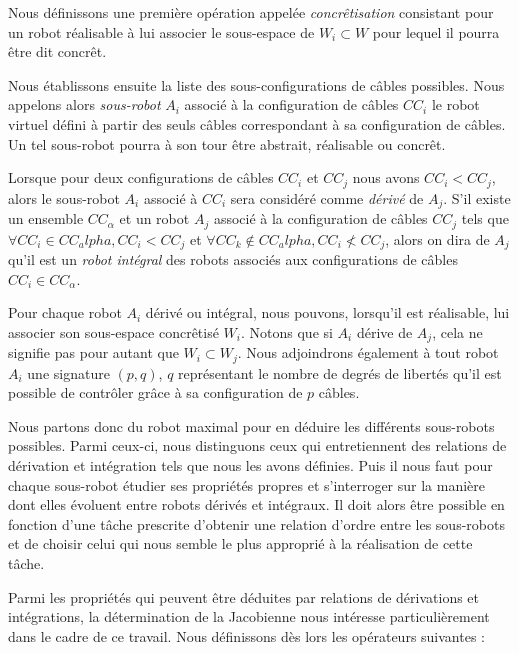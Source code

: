 Nous d\'efinissons une première op\'eration appel\'ee {\it concr\^etisation} 
consistant pour un robot r\'ealisable \`a lui associer le sous-espace de $W_i 
\subset W$ pour lequel il pourra \^etre dit concr\^et. 

Nous \'etablissons ensuite la liste des sous-configurations de c\^ables 
possibles. Nous appelons alors {\it sous-robot} $A_i$ associ\'e \`a la 
configuration de c\^ables $CC_i$ le robot virtuel d\'efini \`a partir des seuls 
c\^ables correspondant \`a sa configuration de c\^ables. Un tel sous-robot 
pourra \`a son tour \^etre abstrait, r\'ealisable ou concr\^et.

Lorsque pour deux configurations de c\^ables $CC_i$ et $CC_j$ nous avons $CC_i< 
CC_j$, alors le sous-robot $A_i$ associ\'e \`a $CC_i$ sera consid\'er\'e comme 
{\it d\'eriv\'e} de $A_j$. S'il existe un ensemble $CC_\alpha$ et un robot 
$A_j$ associ\'e \`a la configuration de c\^ables $CC_j$ tels que $\forall CC_i 
\in CC_alpha, CC_i < CC_j$ et $\forall CC_k \notin CC_alpha, CC_i \nless 
CC_j$, alors on dira de $A_j$ qu'il est un {\it robot int\'egral} des robots 
associ\'es aux configurations de c\^ables $CC_i \in CC_\alpha$.

Pour chaque robot $A_i$ d\'eriv\'e ou int\'egral, nous pouvons, lorsqu'il est 
r\'ealisable, lui associer son sous-espace concr\^etis\'e $W_i$. Notons que 
si $A_i$ d\'erive de $A_j$, cela ne signifie pas pour autant que $W_i 
\subset W_j$. Nous adjoindrons \'egalement \`a tout robot $A_i$ une signature 
$(p,q)$, $q$ repr\'esentant le nombre de degr\'es de libert\'es qu'il est 
possible de contr\^oler gr\^ace \`a sa configuration de $p$ c\^ables.

Nous partons donc du robot maximal pour en d\'eduire les diff\'erents 
sous-robots possibles. Parmi ceux-ci, nous distinguons ceux qui entretiennent 
des relations de d\'erivation et int\'egration tels que nous les avons 
d\'efinies. Puis il nous faut pour chaque sous-robot \'etudier ses 
propri\'et\'es propres et s'interroger sur la mani\`ere dont elles \'evoluent 
entre robots d\'eriv\'es et int\'egraux. Il doit alors \^etre possible en 
fonction d'une t\^ache prescrite d'obtenir une relation d'ordre entre les 
sous-robots et de choisir celui qui nous semble le plus appropri\'e \`a la 
r\'ealisation de cette t\^ache.

Parmi les propri\'et\'es qui peuvent \^etre d\'eduites par relations de 
d\'erivations et int\'egrations, la d\'etermination de la Jacobienne nous 
int\'eresse particuli\`erement dans le cadre de ce travail. Nous d\'efinissons 
d\`es lors les op\'erateurs suivantes :

